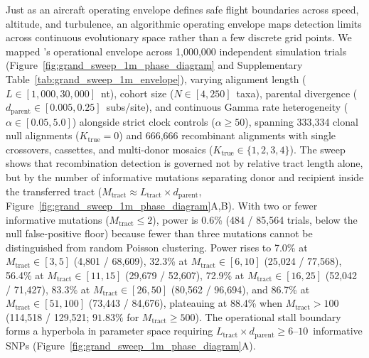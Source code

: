 Just as an aircraft operating envelope defines safe flight boundaries across speed, altitude, and turbulence, an algorithmic operating envelope maps detection limits across continuous evolutionary space rather than a few discrete grid points. We mapped \RhizAeon's operational envelope across 1,000,000 independent simulation trials (Figure~\ref{fig:grand_sweep_1m_phase_diagram} and Supplementary Table~\ref{tab:grand_sweep_1m_envelope}), varying alignment length ($L \in [1{,}000, 30{,}000]$~nt), cohort size ($N \in [4, 250]$~taxa), parental divergence ($d_{\mathrm{parent}} \in [0.005, 0.25]$~subs/site), and continuous Gamma rate heterogeneity ($\alpha \in [0.05, 5.0]$) alongside strict clock controls ($\alpha \ge 50$), spanning 333,334 clonal null alignments ($K_{\mathrm{true}} = 0$) and 666,666 recombinant alignments with single crossovers, cassettes, and multi-donor mosaics ($K_{\mathrm{true}} \in \{1, 2, 3, 4\}$). The sweep shows that recombination detection is governed not by relative tract length alone, but by the number of informative mutations separating donor and recipient inside the transferred tract ($M_{\mathrm{tract}} \approx L_{\mathrm{tract}} \times d_{\mathrm{parent}}$, Figure~\ref{fig:grand_sweep_1m_phase_diagram}A,B). With two or fewer informative mutations ($M_{\mathrm{tract}} \le 2$), power is 0.6\% (484 / 85,564 trials, below the null false-positive floor) because fewer than three mutations cannot be distinguished from random Poisson clustering. Power rises to 7.0\% at $M_{\mathrm{tract}} \in [3, 5]$ (4,801 / 68,609), 32.3\% at $M_{\mathrm{tract}} \in [6, 10]$ (25,024 / 77,568), 56.4\% at $M_{\mathrm{tract}} \in [11, 15]$ (29,679 / 52,607), 72.9\% at $M_{\mathrm{tract}} \in [16, 25]$ (52,042 / 71,427), 83.3\% at $M_{\mathrm{tract}} \in [26, 50]$ (80,562 / 96,694), and 86.7\% at $M_{\mathrm{tract}} \in [51, 100]$ (73,443 / 84,676), plateauing at 88.4\% when $M_{\mathrm{tract}} > 100$ (114,518 / 129,521; $91.83\%$ for $M_{\mathrm{tract}} \ge 500$). The operational stall boundary forms a hyperbola in parameter space requiring $L_{\mathrm{tract}} \times d_{\mathrm{parent}} \ge 6\text{--}10$~informative SNPs (Figure~\ref{fig:grand_sweep_1m_phase_diagram}A).


